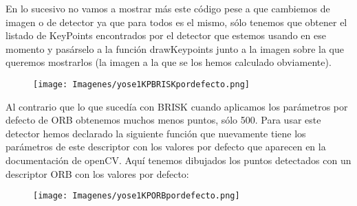 \documentclass[10pt,a4paper]{article}
\begin{document}
En lo sucesivo no vamos a mostrar más este código pese a que cambiemos de imagen o de detector ya que para todos es el mismo, sólo tenemos que obtener el listado de KeyPoints encontrados por el detector que estemos usando en ese momento y pasárselo a la función drawKeypoints junto a la imagen sobre la que queremos mostrarlos (la imagen a la que se los hemos calculado obviamente).

\begin{figure}[H]
\centering
\texttt{[image: Imagenes/yose1KPBRISKpordefecto.png]}
\end{figure}


Al contrario que lo que sucedía con BRISK cuando aplicamos los parámetros por defecto de ORB obtenemos muchos menos puntos, sólo 500. Para usar este detector hemos declarado la siguiente función que nuevamente tiene los parámetros de este descriptor con los valores por defecto que aparecen en la documentación de openCV. Aquí tenemos dibujados los puntos detectados con un descriptor ORB con los valores por defecto:\\

\begin{figure}[H]
\centering
\texttt{[image: Imagenes/yose1KPORBpordefecto.png]}
\end{figure}
\end{document}

